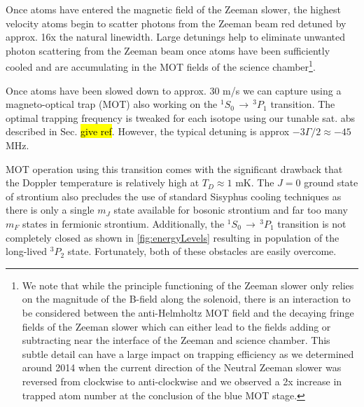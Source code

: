 Once atoms have entered the magnetic field of the Zeeman slower, the highest velocity atoms begin to scatter photons from the Zeeman beam red detuned by approx. 16x the natural linewidth.
Large detunings help to eliminate unwanted photon scattering from the Zeeman beam once atoms have been sufficiently cooled and are accumulating in the MOT fields of the science chamber\footnote{
We note that while the principle functioning of the Zeeman slower only relies on the magnitude of the B-field along the solenoid, there is an interaction to be considered between the anti-Helmholtz MOT field and the decaying fringe fields of the Zeeman slower which can either lead to the fields adding or subtracting near the interface of the Zeeman and science chamber.
This subtle detail can have a large impact on trapping efficiency as we determined around 2014 when the current direction of the Neutral Zeeman slower was reversed from clockwise to anti-clockwise and we observed a 2x increase in trapped atom number at the conclusion of the blue MOT stage.}.

Once atoms have been slowed down to approx. 30 m/s we can capture using a magneto-optical trap (MOT) also working on the $^1S_0\,\rightarrow\,^3P_1$ transition. 
The optimal trapping frequency is tweaked for each isotope using our tunable sat. abs described in Sec. \hl{give ref}.
However, the typical detuning is approx $-3\Gamma/2 \approx -45$ MHz. 

MOT operation using this transition comes with the significant drawback that the Doppler temperature is relatively high at $T_D\approx1$ mK. 
The $J=0$ ground state of strontium also precludes the use of standard Sisyphus cooling techniques as there is only a single $m_J$ state available for bosonic strontium and far too many $m_F$ states in fermionic strontium.
Additionally, the $^1S_0\,\rightarrow\,^3P_1$ transition is not completely closed as shown in \;\ref{fig:energyLevels} resulting in population of the long-lived $^3P_2$ state. 
Fortunately, both of these obstacles are easily overcome.

